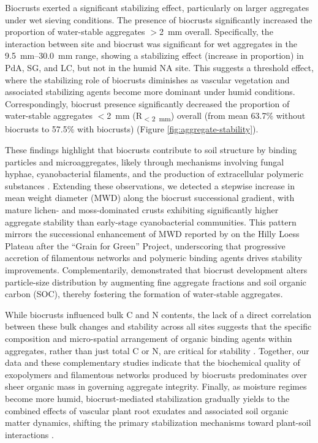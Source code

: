 Biocrusts exerted a significant stabilizing effect, particularly on larger aggregates under wet sieving conditions. The presence of biocrusts significantly increased the proportion of water-stable aggregates $>$\SI{2}{\milli\meter} overall. Specifically, the interaction between site and biocrust was significant for wet aggregates in the \SIrange[range-phrase=--,range-units=single]{9.5}{30.0}{\milli\meter} range, showing a stabilizing effect (increase in proportion) in PdA, SG, and LC, but not in the humid NA site. This suggests a threshold effect, where the stabilizing role of biocrusts diminishes as vascular vegetation and associated stabilizing agents become more dominant under humid conditions. Correspondingly, biocrust presence significantly decreased the proportion of water-stable aggregates $<$\SI{2}{\milli\meter} (R\textsubscript{$<$\SI{2}{\milli\meter}}) overall (from mean 63.7\% without biocrusts to 57.5\% with biocrusts) (Figure \ref{fig:aggregate-stability}).

These findings highlight that biocrusts contribute to soil structure by binding particles and microaggregates, likely through mechanisms involving fungal hyphae, cyanobacterial filaments, and the production of extracellular polymeric substances  \citep{Six2004,Totsche2018}. Extending these observations, we detected a stepwise increase in mean weight diameter (MWD) along the biocrust successional gradient, with mature lichen- and moss-dominated crusts exhibiting significantly higher aggregate stability than early-stage cyanobacterial communities. This pattern mirrors the successional enhancement of MWD reported by \citet{Yang2022} on the Hilly Loess Plateau after the “Grain for Green” Project, underscoring that progressive accretion of filamentous networks and polymeric binding agents drives stability improvements. Complementarily, \citet{Gao2017} demonstrated that biocrust development alters particle-size distribution by augmenting fine aggregate fractions and soil organic carbon (SOC), thereby fostering the formation of water-stable aggregates.

While biocrusts influenced bulk C and N contents, the lack of a direct correlation between these bulk changes and stability across all sites suggests that the specific composition and micro-spatial arrangement of organic binding agents within aggregates, rather than just total C or N, are critical for stability \citep{Wagner2007}. Together, our data and these complementary studies indicate that the biochemical quality of exopolymers and filamentous networks produced by biocrusts predominates over sheer organic mass in governing aggregate integrity. Finally, as moisture regimes become more humid, biocrust-mediated stabilization gradually yields to the combined effects of vascular plant root exudates and associated soil organic matter dynamics, shifting the primary stabilization mechanisms toward plant-soil interactions \citep{BelnapBudel2016}.

